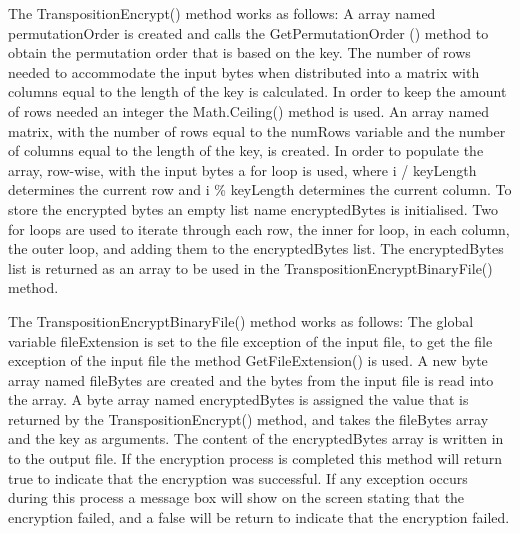 \documentclass[a4paper,oneside,11pt]{book}
\begin{document}
The TranspositionEncrypt() method works as follows:
A array named permutationOrder is created and calls the GetPermutationOrder () method to obtain the permutation order that is based on the key. The number of rows needed to accommodate the input bytes when distributed into a matrix with columns equal to the length of the key is calculated. In order to keep the amount of rows needed an integer the Math.Ceiling() method is used. An array named matrix, with the number of rows equal to the numRows variable and the number of columns equal to the length of the key, is created. In order to populate the array, row-wise, with the input bytes a for loop is used, where i / keyLength determines the current row and i \% keyLength determines the current column. To store the encrypted bytes an empty list name encryptedBytes is initialised. Two for loops are used to iterate through each row, the inner for loop, in each column, the outer loop, and adding them to the encryptedBytes list. The encryptedBytes list is returned as an array to be used in the TranspositionEncryptBinaryFile() method.

The TranspositionEncryptBinaryFile() method works as follows:
The global variable fileExtension is set to the file exception of the input file, to get the file exception of the input file the method GetFileExtension() is used. A new byte array named fileBytes are created and the bytes from the input file is read into the array. A byte array named encryptedBytes is assigned the value that is returned by the TranspositionEncrypt() method, and takes the fileBytes array and the key as arguments. The content of the encryptedBytes array is written in to the output file. If the encryption process is completed this method will return true to indicate that the encryption was successful. If any exception occurs during this process a message box will show on the screen stating that the encryption failed, and a false will be return to indicate that the encryption failed.
\end{document}
